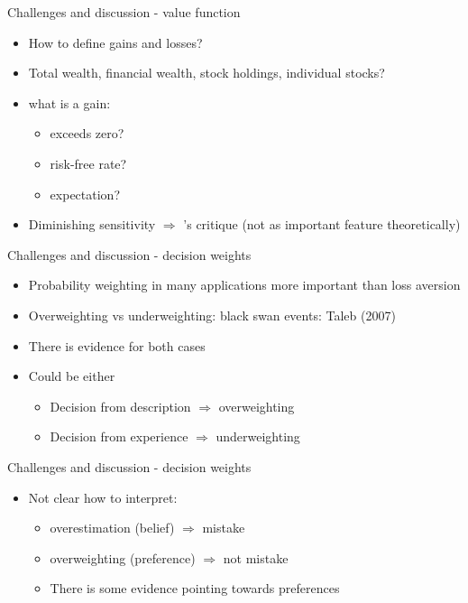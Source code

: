\documentclass[11pt, aspectratio=169]{beamer}
\begin{document}
\begin{frame}{Challenges and discussion - value function}
    \begin{itemize}
        \item How to define gains and losses?\bigskip
        \item Total wealth, financial wealth, stock holdings, individual stocks?\bigskip
        \item what is a gain:\medskip
        \begin{itemize}
            \item exceeds zero?\medskip
            \item risk-free rate?\medskip
            \item expectation?\medskip
        \end{itemize}
                \item Diminishing sensitivity  $\Rightarrow$ \citet{Rabin2000}'s critique (not as important feature theoretically)\medskip
        \end{itemize}
        \end{frame}

      \begin{frame}{Challenges and discussion - decision weights}
    \begin{itemize}
        \item Probability weighting in many applications more important than loss aversion\medskip
        \item Overweighting vs underweighting: black swan events: Taleb (2007)\medskip
        \item There is evidence for both cases\medskip
        \item Could be either \medskip
        \begin{itemize}
        \item Decision from description $\Rightarrow$ overweighting\smallskip
        \item Decision from experience $\Rightarrow$ underweighting\smallskip
        \end{itemize}
    \end{itemize}
\end{frame}


\begin{frame}{Challenges and discussion - decision weights}
    \begin{itemize}
        \item Not clear how to interpret:\medskip
          \begin{itemize}
        \item overestimation (belief) $\Rightarrow$ mistake\smallskip
        \item overweighting (preference) $\Rightarrow$ not mistake\smallskip
       \item There is some evidence pointing towards preferences
           \end{itemize}
    \end{itemize}
\end{frame}
\end{document}

